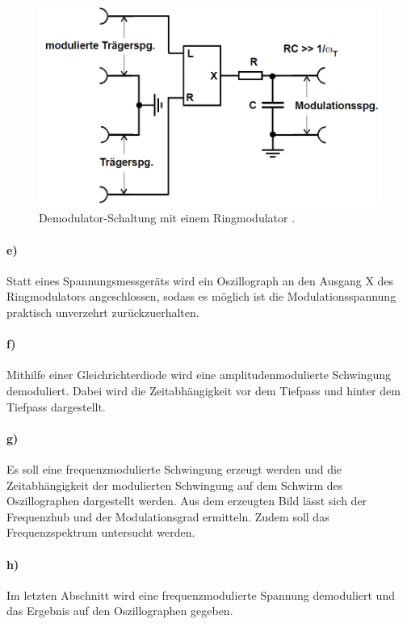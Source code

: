 \begin{figure}[!h]
    \centering
    \includegraphics[width = 14cm]{images/adm_ringmodulator.png}
    \caption{Demodulator-Schaltung mit einem Ringmodulator \cite{V59}.}
    \label{fig:am-schaltung-demodulation}
\end{figure}

\paragraph{e)} 
\label{par:e_}
Statt eines Spannungsmessgeräts wird ein Oszillograph an den Ausgang X des Ringmodulators angeschlossen, sodass es möglich ist die Modulationsspannung praktisch unverzehrt zurückzuerhalten.

\paragraph{f)} %
\label{par:g}
Mithilfe einer Gleichrichterdiode wird eine amplitudenmodulierte Schwingung demoduliert.
Dabei wird die Zeitabhängigkeit vor dem Tiefpass und hinter dem Tiefpass dargestellt.

\paragraph{g)} %
\label{par:g_}
Es soll eine frequenzmodulierte Schwingung erzeugt werden und die Zeitabhängigkeit der modulierten Schwingung auf dem Schwirm des Oszillographen dargestellt werden.
Aus dem erzeugten Bild lässt sich der Frequenzhub und der Modulationsgrad ermitteln.
Zudem soll das Frequenzspektrum untersucht werden.

\paragraph{h)} %
\label{par:h_}
Im letzten Abschnitt wird eine frequenzmodulierte Spannung demoduliert und das Ergebnis auf den Oszillographen gegeben.